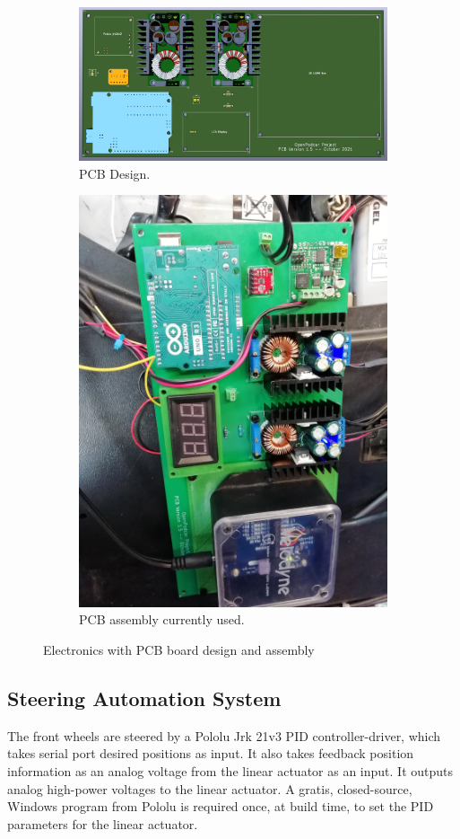 \documentclass[a4paper]{article}
\begin{document}
	\begin{figure}
		\centering
		\begin{subfigure}{0.45\textwidth}
			\centering
			\includegraphics[width=\columnwidth]{hardware/pcb_version_1_5_pic1.png}
			\caption{PCB Design.}
			\label{fig:pcb_design}		
		\end{subfigure}
		\quad
		\begin{subfigure}{0.45\textwidth}
			\centering
			\includegraphics[width=0.5\columnwidth, angle=90]{hardware/pcb_podcar.jpg}
			\caption{PCB assembly currently used.}
			\label{fig:pcb_assembled}
		\end{subfigure}	
		\caption{Electronics with PCB board design and assembly}
	\end{figure}
	
	
	\subsection{Steering Automation System}
	
	The front wheels are steered by a Pololu Jrk 21v3 PID controller-driver, which takes serial port desired positions as input. It also takes feedback position information as an analog voltage from the linear actuator as an input. It outputs analog high-power voltages to the linear actuator. A gratis, closed-source, Windows program from Pololu is required once, at build time, to set the PID parameters for the linear actuator. 
	
\end{document}
